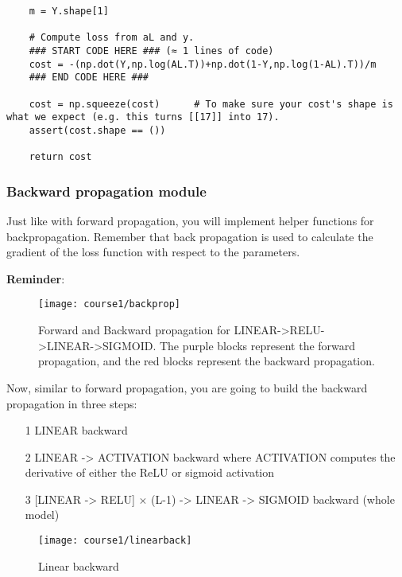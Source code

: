 {\begin{verbatim}
    m = Y.shape[1]

    # Compute loss from aL and y.
    ### START CODE HERE ### (≈ 1 lines of code)
    cost = -(np.dot(Y,np.log(AL.T))+np.dot(1-Y,np.log(1-AL).T))/m
    ### END CODE HERE ###
    
    cost = np.squeeze(cost)      # To make sure your cost's shape is what we expect (e.g. this turns [[17]] into 17).
    assert(cost.shape == ())
    
    return cost
\end{verbatim}


\subsubsection{Backward propagation module}

Just like with forward propagation, you will implement helper functions for backpropagation. Remember that back propagation is used to calculate the gradient of the loss function with respect to the parameters.

{\textbf {Reminder}}:

\begin{figure}[h]
\begin{center}
\texttt{[image: course1/backprop]}
\end{center}
\caption{ Forward and Backward propagation for LINEAR->RELU->LINEAR->SIGMOID. The purple blocks represent the forward propagation, and the red blocks represent the backward propagation.}
\label{fig:backprop}
\end{figure}

Now, similar to forward propagation, you are going to build the backward propagation in three steps:
\begin{itemize}
\item[1] LINEAR backward
\item[2] LINEAR -> ACTIVATION backward where ACTIVATION computes the derivative of either the ReLU or sigmoid activation
\item[3] [LINEAR -> RELU] $\times $ (L-1) -> LINEAR -> SIGMOID backward (whole model)
\end{itemize}




\begin{figure}[h]
\begin{center}
\texttt{[image: course1/linearback]}
\end{center}
\caption{Linear backward}
\label{fig:linearback}
\end{figure}

}
